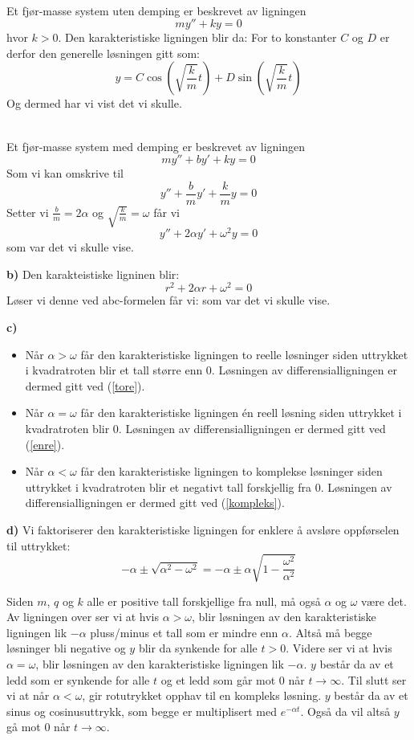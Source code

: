 \\
Et fjør-masse system uten demping er beskrevet av ligningen
\[ my''+ky =0 \]
hvor $ k>0 $. Den karakteristiske ligningen blir da:
For to konstanter $ C $ og $ D $ er derfor den generelle løsningen gitt som:
\[y= C\cos\left(\sqrt{\frac{k}{m}}t\right)+D \sin\left(\sqrt{\frac{k}{m}}t\right)\]
Og dermed har vi vist det vi skulle.

\\
Et fjør-masse system med demping er beskrevet av ligningen
\[ my''+by'+ky=0 \]
Som vi kan omskrive til
\[ y'' +\frac{b}{m}y'+\frac{k}{m}y = 0 \]
Setter vi  $ \frac{b}{m}=2\alpha $ og $ \sqrt{\frac{k}{m}}=\omega $ får vi
\[ y''+2\alpha y'+\omega^2y=0 \]
som var det vi skulle vise.

\textbf{b)} Den karakteistiske ligninen blir:
\[  r^2+2\alpha r+\omega^2=0 \]
Løser vi denne ved abc-formelen får vi:
som var det vi skulle vise.

\textbf{c)}\vs \begin{itemize}
	\item Når $ \alpha>\omega $ får den karakteristiske ligningen to reelle løsninger siden uttrykket i kvadratroten blir et tall større enn 0. Løsningen av differensialligningen er dermed gitt ved (\ref{tore}).
	\item Når $ \alpha=\omega $ får den karakteristiske ligningen én reell løsning siden uttrykket i kvadratroten blir 0. Løsningen av differensialligningen er dermed gitt ved (\ref{enre}).
	\item Når $ \alpha<\omega $ får den karakteristiske ligningen to komplekse løsninger siden uttrykket i kvadratroten blir et negativt tall forskjellig fra 0. Løsningen av differensialligningen er dermed gitt ved (\ref{kompleks}).	
\end{itemize}
\textbf{d)} Vi faktoriserer den karakteristiske ligningen for enklere å avsløre oppførselen til uttrykket:
\[  -\alpha\pm \sqrt{\alpha^2-\omega^2} = -\alpha\pm\alpha \sqrt{1-\frac{\omega^2}{\alpha^2}}\]

Siden $ m $, $ q $ og $ k $ alle er positive tall forskjellige fra null, må også $ \alpha $ og $ \omega $ være det. Av ligningen over ser vi at hvis $ {\alpha>\omega} $, blir løsningen av den karakteristiske ligningen lik $ -\alpha $ pluss/minus et tall som er mindre enn $ \alpha $. Altså må begge løsninger bli negative og $ y $ blir da synkende for alle $ t>0 $. Videre ser vi at hvis $ {\alpha=\omega} $, blir løsningen av den karakteristiske ligningen lik $ -\alpha $. $ y $ består da av et ledd som er synkende for alle $ t $ og et ledd som går mot 0 når $ {t\to\infty} $. Til slutt ser vi at når $ {\alpha<\omega }$, gir rotutrykket opphav til en kompleks løsning. $ y $ består da av et sinus og cosinusuttrykk, som begge er multiplisert med $ e^{-\alpha t} $. Også da vil altså $ y $ gå mot 0 når $ t\to\infty $.
